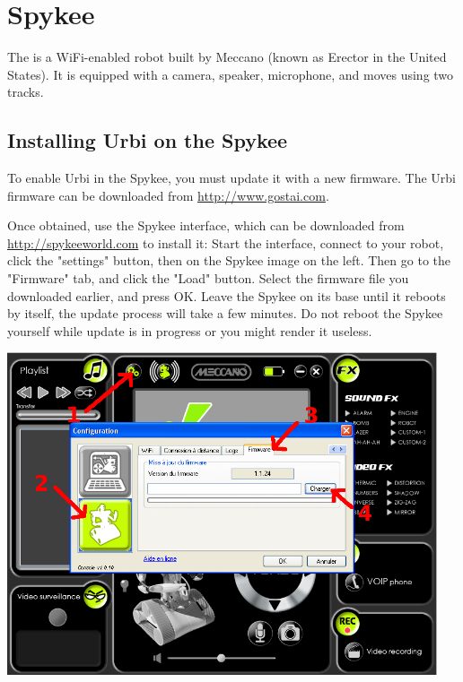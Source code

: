 
\chapter{Spykee}
\label{sec:spykee}

The  is a WiFi-enabled robot built by Meccano (known as
Erector in the United States). It is equipped with a camera, speaker,
microphone, and moves using two tracks.

\section{Installing Urbi on the Spykee}

To enable Urbi in the Spykee, you must update it with a new firmware. The Urbi
firmware can be downloaded from \url{http://www.gostai.com}.

Once obtained, use the Spykee interface, which can be downloaded from
\url{http://spykeeworld.com} to install it: Start the interface, connect to
your robot, click the "settings" button, then on the Spykee image on the left.
Then go to the "Firmware" tab, and click the "Load" button. Select the firmware
file you downloaded earlier, and press OK. Leave the Spykee on its base until it
reboots by itself, the update process will take a few minutes. Do not reboot
the Spykee yourself while update is in progress or you might render it useless.
\begin{center}
\includegraphics[width=0.95\textwidth]{img/spykee-flash-instructions}
\end{center}

